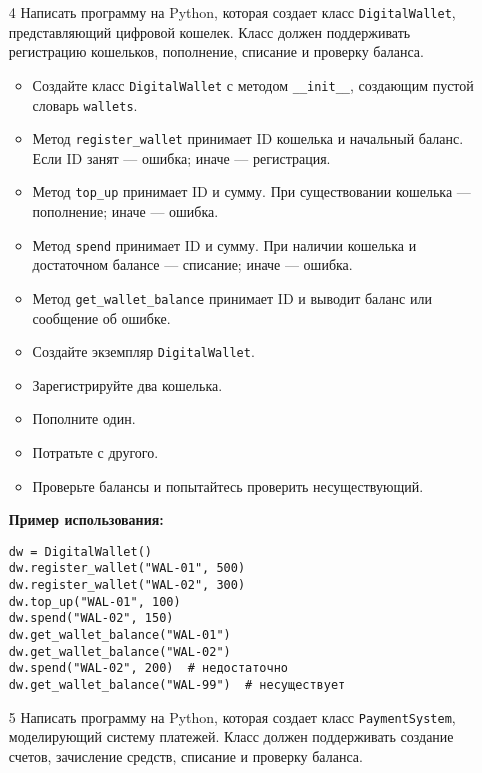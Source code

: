 \begin{enumerate}
\item[4] Написать программу на Python, которая создает класс \texttt{DigitalWallet}, представляющий цифровой кошелек. Класс должен поддерживать регистрацию кошельков, пополнение, списание и проверку баланса.

\begin{itemize}
    \item Создайте класс \texttt{DigitalWallet} с методом \texttt{\_\_init\_\_}, создающим пустой словарь \texttt{wallets}.
    \item Метод \texttt{register\_wallet} принимает ID кошелька и начальный баланс. Если ID занят — ошибка; иначе — регистрация.
    \item Метод \texttt{top\_up} принимает ID и сумму. При существовании кошелька — пополнение; иначе — ошибка.
    \item Метод \texttt{spend} принимает ID и сумму. При наличии кошелька и достаточном балансе — списание; иначе — ошибка.
    \item Метод \texttt{get\_wallet\_balance} принимает ID и выводит баланс или сообщение об ошибке.
    \item Создайте экземпляр \texttt{DigitalWallet}.
    \item Зарегистрируйте два кошелька.
    \item Пополните один.
    \item Потратьте с другого.
    \item Проверьте балансы и попытайтесь проверить несуществующий.
\end{itemize}

\textbf{Пример использования:}

\begin{verbatim}
dw = DigitalWallet()
dw.register_wallet("WAL-01", 500)
dw.register_wallet("WAL-02", 300)
dw.top_up("WAL-01", 100)
dw.spend("WAL-02", 150)
dw.get_wallet_balance("WAL-01")
dw.get_wallet_balance("WAL-02")
dw.spend("WAL-02", 200)  # недостаточно
dw.get_wallet_balance("WAL-99")  # несуществует
\end{verbatim}

\item[5] Написать программу на Python, которая создает класс \texttt{PaymentSystem}, моделирующий систему платежей. Класс должен поддерживать создание счетов, зачисление средств, списание и проверку баланса.


\end{enumerate}
